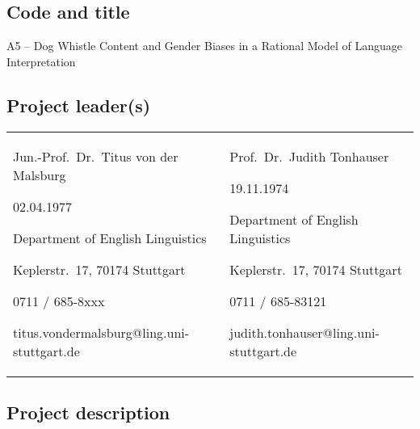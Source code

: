\documentclass[11pt]{article}
\newcommand{\dfgcomments}[1]{\textcolor{green}{#1}}
\renewcommand{\dfgcomments}[1]{}
\begin{document}


\subsection{Code and title}

\noindent A5 -- Dog Whistle Content and Gender Biases in a Rational Model of Language Interpretation

\subsection{Project leader(s)}

\dfgcomments{List the academic title, first name, last name, date of birth, work address, telephone number and e-mail address.}

\noindent 
\begin{tabular}{p{}p{}}
  Jun.-Prof.\ Dr.\ Titus von der Malsburg \par
  02.04.1977 \par
  Department of English Linguistics \par
  Keplerstr.\ 17, 70174 Stuttgart \par
  0711 / 685-8xxx \par
  titus.vondermalsburg@ling.uni-stuttgart.de
  &
  Prof.\ Dr.\ Judith Tonhauser \par
  19.11.1974 \par
  Department of English Linguistics \par
  Keplerstr.\ 17, 70174 Stuttgart \par
  0711 / 685-83121 \par
  judith.tonhauser@ling.uni-stuttgart.de
\end{tabular}


\subsection{Project description}
\end{document}
